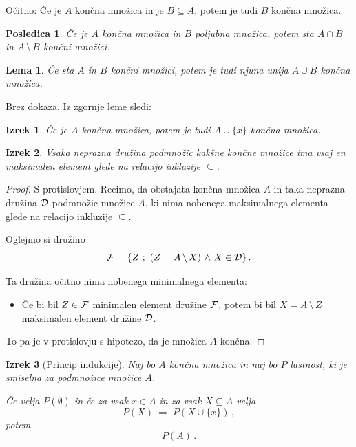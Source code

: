 \documentclass[11pt,paper=b5,footinclude,headinclude]{scrbook} %
\def\inn {{~\wedge~}}
\def\sledi {{~\Rightarrow~}}
\def\brez {{\,\setminus\,}}
\newtheorem*{izrek}{Izrek}
\newtheorem*{lema}{Lema}
\newtheorem*{posledica}{Posledica}
\begin{document}
Očitno:
Če je $A$ končna množica in je $B\subseteq A$, potem je tudi $B$ končna
množica.

\begin{posledica}
Če je $A$ končna množica in $B$ poljubna množica, potem sta
$A\cap B$ in $A\brez B$ končni množici.
\end{posledica}

\begin{lema}
Če sta $A$ in $B$ končni množici, potem je tudi njuna unija $A\cup B$ končna množica.
\end{lema}

Brez dokaza. Iz zgornje leme sledi:

\begin{izrek}
Če je $A$ končna množica, potem je tudi $A\cup \{x\}$ končna množica.
\end{izrek}

\begin{izrek}
Vsaka neprazna družina podmnožic kakšne končne množice ima vsaj en maksimalen element glede na relacijo inkluzije $\subseteq$.
\end{izrek}

\begin{proof}
S protislovjem. Recimo, da obstajata končna množica $A$ in taka neprazna
družina ${\cal D}$ podmnožic množice $A$, ki nima nobenega maksimalnega elementa glede na relacijo inkluzije $\subseteq$.

Oglejmo si družino $${\cal F} = \{Z~;~(Z = A\brez X)\inn X\in {\cal D}\}\,.$$

Ta družina očitno nima nobenega minimalnega elementa:
\begin{itemize}
\item Če bi bil $Z\in {\cal F}$ minimalen element družine  ${\cal F}$, potem bi bil
$X = A\brez Z$ maksimalen element družine  ${\cal D}$.
\end{itemize}
To pa je v protislovju s hipotezo, da je množica $A$ končna.
\end{proof}


\begin{izrek}[Princip indukcije]\label{izrek:indukcija}
Naj bo $A$ končna množica in naj bo $P$ lastnost, ki je smiselna za podmnožice množice $A$.

Če velja $P(\emptyset)$ in če za vsak $x\in A$ in za vsak $X\subseteq A$ velja
$$P(X)\sledi P(X\cup \{x\})\,,$$
potem
$$P(A)\,.$$
\end{izrek}
\end{document}
